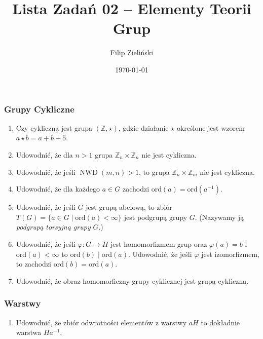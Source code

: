 \documentclass{article}
\title{Lista Zadań 02 --  Elementy Teorii Grup}
\author{Filip Zieliński}
\date{\today}
\newcommand{\ord}{\textrm{ord}}
\let\phi\varphi
\begin{document}
\maketitle

\subsubsection*{Grupy Cykliczne}
\begin{enumerate}
    \item Czy cykliczna jest grupa $(\mathbb{Z}, \star)$, gdzie działanie $\star$ określone jest wzorem $a \star b = a + b + 5$.
    \item Udowodnić, że dla $n > 1$ grupa $\mathbb{Z}_n \times \mathbb{Z}_n$ nie jest cykliczna.
    \item Udowodnić, że jeśli $\operatorname{NWD}(m,n) > 1$, to grupa $\mathbb{Z}_n \times \mathbb{Z}_m$ nie jest cykliczna.
    \item Udowodnić, że dla każdego $a \in G$ zachodzi $\ord (a) = \ord (a^{-1})$.
    \item Udowodnić, że jeśli $G$ jest grupą abelową, to zbiór  \\ $T(G) = \{ a \in G \mid \ord (a) < \infty \}$ jest podgrupą grupy $G$. (Nazywamy ją \textit{podgrupą torsyjną grupy} $G$.)
    \item Udowodnić, że jeśli $\phi : G \rightarrow H$ jest homomorfizmem grup oraz $\phi (a) = b$ i $\ord (a) < \infty$ to $\ord (b) \mid \ord (a)$. Udowodnić, że jeśli $\phi$ jest izomorfizmem, to zachodzi $\ord (b) = \ord (a)$.
    \item Udowodnić, że obraz homomorficzny grupy cyklicznej jest grupą cykliczną.
\end{enumerate}

\subsubsection*{Warstwy}
\begin{enumerate}[resume]
    \item  Udowodnić, że zbiór odwrotności elementów z warstwy $aH$ to dokładnie warstwa $Ha^{-1}$.
\end{enumerate}
\end{document}
